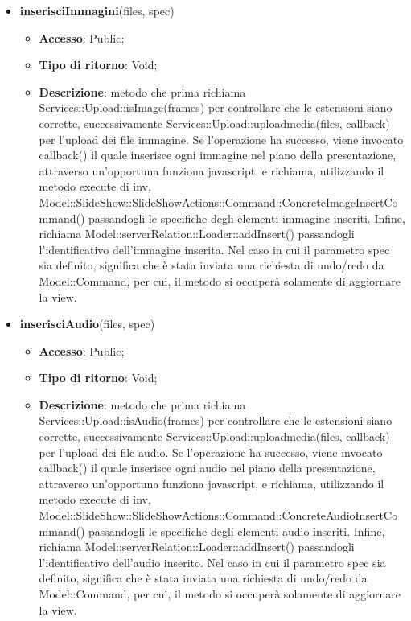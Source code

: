 {{\begin{itemize}
\begin{itemize}
		\end{itemize}
		\item \textbf{inserisciImmagini}(files, spec)
		\begin{itemize}
			\item \textbf{Accesso}: Public;
			\item \textbf{Tipo di ritorno}: Void;
			\item \textbf{Descrizione}: metodo che prima richiama Services::\-Upload::\-isImage(frames) per controllare che le estensioni siano corrette, successivamente Services::\-Upload::\-uploadmedia(files, callback) per l'upload dei file immagine. Se l'operazione ha successo, viene invocato callback() il quale inserisce ogni immagine nel piano della presentazione, attraverso un'opportuna funziona javascript, e richiama, utilizzando il metodo execute di inv, Model::\-SlideShow::\-SlideShowActions::\-Command::\-ConcreteImageInsertCommand() passandogli le specifiche degli elementi immagine inseriti. Infine, richiama Model::\-serverRelation::\-Loader::\-addInsert() passandogli l'identificativo dell'immagine inserita. Nel caso in cui il parametro spec sia definito, significa che è stata inviata una richiesta di undo/redo da Model::\-Command, per cui, il metodo si occuperà solamente di aggiornare la view.
		\end{itemize}
		\item \textbf{inserisciAudio}(files, spec)
		\begin{itemize}
			\item \textbf{Accesso}: Public;
			\item \textbf{Tipo di ritorno}: Void;
			\item \textbf{Descrizione}: metodo che prima richiama Services::\-Upload::\-isAudio(frames) per controllare che le estensioni siano corrette, successivamente Services::\-Upload::\-uploadmedia(files, callback) per l'upload dei file audio. Se l'operazione ha successo, viene invocato callback() il quale inserisce ogni audio nel piano della presentazione, attraverso un'opportuna funziona javascript, e richiama, utilizzando il metodo execute di inv, Model::\-SlideShow::\-SlideShowActions::\-Command::\-ConcreteAudioInsertCommand() passandogli le specifiche degli elementi audio inseriti. Infine, richiama Model::\-serverRelation::\-Loader::\-addInsert() passandogli l'identificativo dell'audio inserito. Nel caso in cui il parametro spec sia definito, significa che è stata inviata una richiesta di undo/redo da Model::\-Command, per cui, il metodo si occuperà solamente di aggiornare la view.
		\end{itemize}

\end{itemize}}}
